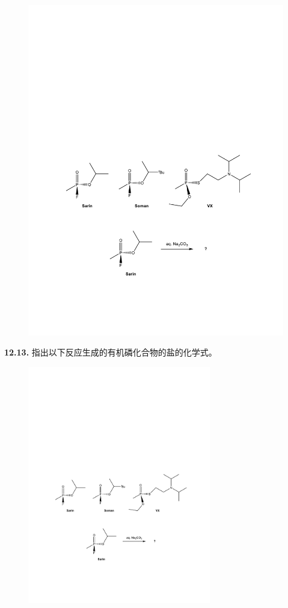 \begin{figure}[h]
	\centering
	\includegraphics[width=15cm]{./pic/t12-5.pdf}
\end{figure}

\noindent\textbf{12.13.} 指出以下反应生成的有机磷化合物的盐的化学式。

\begin{figure}[h]
	\centering
	\includegraphics[width=8cm]{./pic/t12-6.pdf}
\end{figure}

